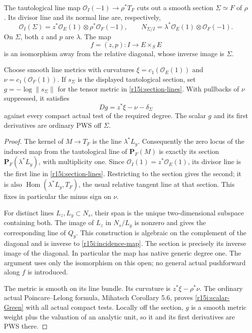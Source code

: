 \begin{lemma}
\label{r15i:divisor}
The tautological line map
$\mathcal O_I(-1)\to\rho^*T_F$ cuts out a smooth section
$\Sigma\simeq F$ of $\rho$.  Its divisor line and its normal
line are, respectively,
\[
 \mathcal O_I(\Sigma)
        =z^*\mathcal O_E(1)\otimes\rho^*\mathcal O_F(-1),
 \qquad
 N_{\Sigma/I}
        =\lambda^*\mathcal O_E(1)\otimes\mathcal O_F(-1).
\tag{I15.5}\label{r15i:section-lines}
\]
On $\Sigma$, both $z$ and $p$ are $\lambda$.
The map
\[
        f=(z,p):I\longrightarrow E\times_S E
\tag{I15.6}\label{r15i:incidence-map}
\]
is an isomorphism away from the relative diagonal, whose inverse
image is $\Sigma$.

Choose smooth line metrics with curvatures
$\xi=c_1(\mathcal O_E(1))$ and
$\nu=c_1(\mathcal O_F(1))$.  If $s_\Sigma$ is the displayed
tautological section, set $g=-\log\|s_\Sigma\|$ for the
tensor metric in \eqref{r15i:section-lines}.  With pullbacks
of $\nu$ suppressed, it satisfies
\[
                 Dg=z^*\xi-\nu-\delta_\Sigma
\tag{I15.7}\label{r15i:scalar-Green}
\]
against every compact actual test of the required degree.
The scalar $g$ and its first derivatives are ordinary PWS off
$\Sigma$.
\end{lemma}

\begin{proof}
The kernel of $M\to T_F$ is the line $\lambda^*L_y$.
Consequently the zero locus of the induced map from the
tautological line of $\mathbf P_F(M)$ is exactly its section
$\mathbf P_F(\lambda^*L_y)$, with multiplicity one.
Since $\mathcal O_I(1)=z^*\mathcal O_E(1)$, its divisor
line is the first line in \eqref{r15i:section-lines}.
Restricting to the section gives the second; it is also
$\operatorname{Hom}(\lambda^*L_y,T_F)$, the usual relative
tangent line at that section.  This fixes in particular the
minus sign on $\nu$.

For distinct lines $L_z,L_y\subset N_s$, their span is the
unique two-dimensional subspace containing both.  The image of
$L_z$ in $N_s/L_y$ is nonzero and gives the corresponding line
of $Q_y$.  This construction is algebraic on the complement
of the diagonal and is inverse to \eqref{r15i:incidence-map}.
The section is precisely its inverse image of the diagonal.
In particular the map has native generic degree one.  The
argument uses only the isomorphism on this open; no general
actual pushforward along $f$ is introduced.

The metric is smooth on its line bundle.  Its curvature is
$z^*\xi-\rho^*\nu$.  The ordinary actual Poincare--Lelong
formula, Mihatsch Corollary 5.6, proves
\eqref{r15i:scalar-Green} with all actual compact tests.
Locally off the section, $g$ is a smooth metric weight plus
the valuation of an analytic unit, so it and its first
derivatives are PWS there.
\end{proof}

